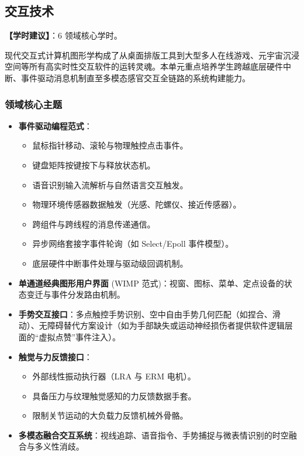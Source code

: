 \subsection{交互技术}
\textbf{【学时建议】}：6 领域核心学时。

现代交互式计算机图形学构成了从桌面排版工具到大型多人在线游戏、元宇宙沉浸空间等所有高实时性交互软件的运转灵魂。本单元重点培养学生跨越底层硬件中断、事件驱动消息机制直至多模态感官交互全链路的系统构建能力。

\subsubsection{领域核心主题}
\begin{itemize}
    \item \textbf{事件驱动编程范式}：
    \begin{itemize}
        \item 鼠标指针移动、滚轮与物理触控点击事件。
        \item 键盘矩阵按键按下与释放状态机。
        \item 语音识别输入流解析与自然语言交互触发。
        \item 物理环境传感器数据触发（光感、陀螺仪、接近传感器）。
        \item 跨组件与跨线程的消息传递通信。
        \item 异步网络套接字事件轮询（如 Select/Epoll 事件模型）。
        \item 底层硬件中断事件处理与驱动级回调机制。
    \end{itemize}
    \item \textbf{单通道经典图形用户界面} (WIMP 范式)：视窗、图标、菜单、定点设备的状态变迁与事件分发路由机制。
    \item \textbf{手势交互接口}：多点触控手势识别、空中自由手势几何匹配（如捏合、滑动）、无障碍替代方案设计（如为手部缺失或运动神经损伤者提供软件逻辑层面的“虚拟点赞”事件注入）。
    \item \textbf{触觉与力反馈接口}：
    \begin{itemize}
        \item 外部线性振动执行器（LRA 与 ERM 电机）。
        \item 具备压力与纹理触觉感知的力反馈数据手套。
        \item 限制关节运动的大负载力反馈机械外骨骼。
    \end{itemize}
    \item \textbf{多模态融合交互系统}：视线追踪、语音指令、手势捕捉与微表情识别的时空融合与多义性消歧。

\end{itemize}
